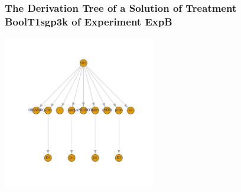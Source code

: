  \begin{frame}
 \frametitle{ The Derivation Tree of a Solution of Treatment BoolT1sgp3k of Experiment ExpB }
 \begin{center}
\includegraphics[width=0.5\textwidth, angle=0]
{ExpBDerivationTreeFigure006.pdf}
 \end{center}
 \label{report/ExpBDerivationTreeFigure006.pdf}  
 \end{frame}


